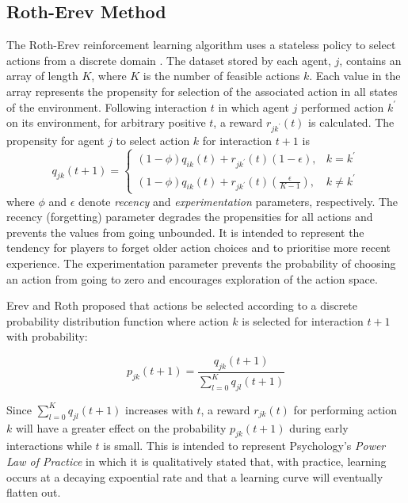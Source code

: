 \subsection{Roth-Erev Method}
\label{sec:rotherev}
The Roth-Erev reinforcement learning algorithm uses a stateless policy to
select actions from a discrete domain \cite{roth:games,roth:aer}.  The dataset
stored by each agent, $j$, contains an array of length $K$, where $K$ is the
number of feasible actions $k$.  Each value in the array represents the
propensity for selection of the associated action in all states of the
environment.  Following interaction $t$ in which agent $j$ performed action
$k^\prime$ on its environment, for arbitrary positive $t$, a reward
$r_{jk^\prime}(t)$ is calculated.  The propensity for agent $j$ to select
action $k$ for interaction $t+1$ is
\begin{equation}
q_{jk}(t+1) =
\begin{cases}
(1-\phi)q_{ik}(t) + r_{jk^\prime}(t)(1-\epsilon), & \text{$k = k^\prime$} \\
(1-\phi)q_{ik}(t) + r_{jk^\prime}(t)(\frac{\epsilon}{K-1}), & \text{$k \ne
k^\prime$}
\end{cases}
\end{equation}
where $\phi$ and $\epsilon$ denote \textit{recency} and
\textit{experimentation} parameters, respectively.  The recency (forgetting)
parameter degrades the propensities for all actions and prevents the values
from going unbounded.  It is intended to represent the tendency for players to
forget older action choices and to prioritise more recent experience.  The
experimentation parameter prevents the probability of choosing an action from
going to zero and encourages exploration of the action space.

Erev and Roth proposed that actions be selected according to a discrete
probability distribution function where action $k$ is selected for interaction
$t+1$ with probability:

\begin{equation}
p_{jk}(t+1) = \frac{q_{jk}(t+1)}{\sum_{l=0}^K q_{jl}(t+1)}
\end{equation}

Since $\sum_{l=0}^K q_{jl}(t+1)$ increases with $t$, a reward $r_{jk}(t)$ for
performing action $k$ will have a greater effect on the probability
$p_{jk}(t+1)$ during early interactions while $t$ is small.  This is intended
to represent Psychology's \textit{Power Law of Practice} in which it is
qualitatively stated that, with practice, learning occurs at a decaying
expoential rate and that a learning curve will eventually flatten out.

